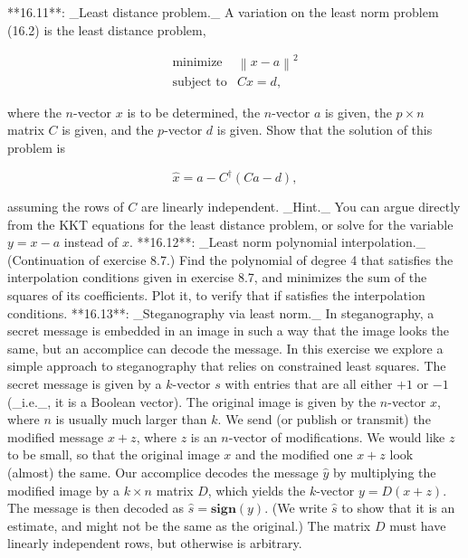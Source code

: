 

**16.11**: _Least distance problem._ A variation on the least norm problem (16.2) is the least distance problem,

\[\begin{array}{ll}\mbox{minimize}&\left\|x-a\right\|^{2}\\ \mbox{subject to}&Cx=d,\end{array}\]

where the \(n\)-vector \(x\) is to be determined, the \(n\)-vector \(a\) is given, the \(p\times n\) matrix \(C\) is given, and the \(p\)-vector \(d\) is given. Show that the solution of this problem is

\[\hat{x}=a-C^{\dagger}(Ca-d),\]

assuming the rows of \(C\) are linearly independent. _Hint._ You can argue directly from the KKT equations for the least distance problem, or solve for the variable \(y=x-a\) instead of \(x\).
**16.12**: _Least norm polynomial interpolation._ (Continuation of exercise 8.7.) Find the polynomial of degree 4 that satisfies the interpolation conditions given in exercise 8.7, and minimizes the sum of the squares of its coefficients. Plot it, to verify that if satisfies the interpolation conditions.
**16.13**: _Steganography via least norm._ In steganography, a secret message is embedded in an image in such a way that the image looks the same, but an accomplice can decode the message. In this exercise we explore a simple approach to steganography that relies on constrained least squares. The secret message is given by a \(k\)-vector \(s\) with entries that are all either \(+1\) or \(-1\) (_i.e._, it is a Boolean vector). The original image is given by the \(n\)-vector \(x\), where \(n\) is usually much larger than \(k\). We send (or publish or transmit) the modified message \(x+z\), where \(z\) is an \(n\)-vector of modifications. We would like \(z\) to be small, so that the original image \(x\) and the modified one \(x+z\) look (almost) the same. Our accomplice decodes the message \(\hat{y}\) by multiplying the modified image by a \(k\times n\) matrix \(D\), which yields the \(k\)-vector \(y=D(x+z)\). The message is then decoded as \(\hat{s}=\mathbf{sign}(y)\). (We write \(\hat{s}\) to show that it is an estimate, and might not be the same as the original.) The matrix \(D\) must have linearly independent rows, but otherwise is arbitrary.

